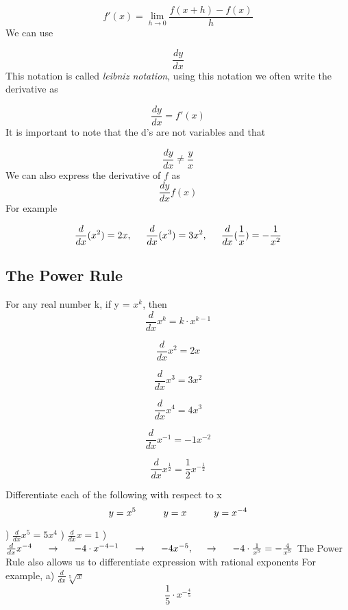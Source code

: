 \documentclass{report}
\begin{document}
$$ f'(x) = \displaystyle\lim_{h\to 0}\frac{f(x+h) - f(x)}{h}$$
We can use

$$\frac{dy}{dx}$$
\bigbreak \noindent
This notation is called \textit{leibniz notation}, using this notation we often write the derivative as

$$\frac{dy}{dx} = f'(x)$$
\bigbreak \noindent
It is important to note that the d's are not variables and that

$$\frac{dy}{dx} \neq \frac{y}{x}$$
\bigbreak \noindent
We can also express the derivative of $f$ as
$$\frac{dy}{dx}f(x)$$
\bigbreak \noindent
For example

$$ \frac{d}{dx}(x^2) = 2x, \hspace{5mm} \frac{d}{dx}(x^3) = 3x^2, \hspace{5mm}  \frac{d}{dx}(\frac{1}{x}) = -\frac{1}{x^2}$$
\bigbreak \noindent
\subsection*{The Power Rule}
\bigbreak \noindent
\begin{mdframed}
For any real number k, if y = $x^k$, then
$$ \frac{d}{dx}x^k = k \cdot x^{k-1}$$
\vspace{2mm}
\end{mdframed}
\bigbreak \noindent\bigbreak \noindent
$$ \frac{d}{dx}x^2 = 2x$$ 

$$ \frac{d}{dx}x^3 = 3x^2$$

$$ \frac{d}{dx}x^4 = 4x^3$$

$$ \frac{d}{dx}x^{-1} = -1x^{-2}$$

$$ \frac{d}{dx}x^{\frac{1}{2}} = \frac{1}{2}x^{-\frac{1}{2}}$$
\pagebreak
\begin{mdframed}
 Differentiate each of the following with respect to x 
 $$ y = x^5 \hspace{10mm} y = x \hspace{10mm}y = x^{-4}$$
\end{mdframed}
\bigbreak {}) $ \frac{d}{dx}x^5 
$$= 5x^4$
\bigbreak {}) $ \frac{d}{dx}x = 1$
\bigbreak {}) $ \frac{d}{dx}x^{-4} \hspace{5mm} \rightarrow \hspace{5mm} -4 \cdot x^{-4-1} \hspace{5mm} \rightarrow \hspace{5mm} -4x^{-5}, \hspace{5mm} \rightarrow \hspace{5mm} -4 \cdot\frac{1}{x^5} = -\frac{4}{x^5}$
\bigbreak \noindent \bigbreak \noindent
The Power Rule also allows us to differentiate expression with rational exponents
\bigbreak \noindent
For example, 
\bigbreak \noindent
a) $\frac{d}{dx}\sqrt[5]{x}$
$$ \frac{1}{5} \cdot x^{-\frac{4}{5}}$$
\end{document}
